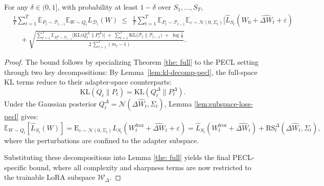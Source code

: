 \documentclass{article}
\begin{document}
\begin{theorem}

For any $\delta\in(0,1]$, with probability at least $1-\delta$ over $S_1,\ldots,S_T$,
\begin{equation}\label{eq:pecl-main}
\begin{aligned}
&\frac{1}{T}\sum_{t=1}^T
\mathbb{E}_{P_t\sim\mathcal P_{t-1}}\mathbb{E}_{W\sim Q_t}L_{\mathcal{D}_t}(W)
\ \le\
\ \frac{1}{T}\sum_{t=1}^T
\mathbb{E}_{P_t\sim\mathcal P_{t-1}}
\mathbb{E}_{\varepsilon \sim \mathcal{N}(0, \Sigma_t)}[\hat{L}_{S_t}(W_0 + \widehat{\Delta W}_t + \varepsilon)
\\
&\quad +\sqrt{\frac{
\displaystyle \sum_{t=1}^T \mathbb{E}_{P_t^\Delta\sim\mathcal P_{t-1}}\!\Big[\mathrm{KL}\!\big(Q_t^\Delta\|P_t^\Delta\big)\Big]
\;+\;\displaystyle \sum_{t=1}^T \mathrm{KL}\!\big(\mathcal P_t\|\mathcal P_{t-1}\big)
\;+\;\log\!\frac{1}{\delta}
}{2\,\displaystyle\sum_{t=1}^T (m_t-1)}}.
\end{aligned}
\end{equation}
\end{theorem}



\begin{proof}
The bound follows by specializing Theorem \ref{the: full} to the PECL setting through two key decompositions:
By Lemma~\ref{lem:kl-decomp-pecl}, the full-space KL terms reduce to their adapter-space counterparts:
\[
\mathrm{KL}(Q_t \| P_t) = \mathrm{KL}(Q_t^\Delta \| P_t^\Delta).
\]
Under the Gaussian posterior $Q_t^\Delta = \mathcal{N}(\Delta\hat{W}_t, \Sigma_t)$, Lemma \ref{lem:subspace-loss-pecl} gives:
\[
\mathbb{E}_{W \sim Q_t}[\hat{L}_{S_t}(W)] 
= \mathrm{E}_{\varepsilon \sim \mathcal{N}(0, \Sigma_t)}{L}_{S_t}(W^{\mathrm{froz}}_t+\widehat{\Delta W}_t + \varepsilon)
 = \hat{L}_{S_t}(W^{\mathrm{froz}}_t + \widehat{\Delta{W}_t}) + \mathrm{RS}_t^\Delta(\Delta\widehat{W}_t, \Sigma_t),
\]
where the perturbations are confined to the adapter subspace.

Substituting these decompositions into Lemma \ref{the: full} yields the final PECL-specific bound, where all complexity and sharpness terms are now restricted to the trainable LoRA subspace $\mathcal{W}_\Delta$.

\end{proof}
\end{document}
